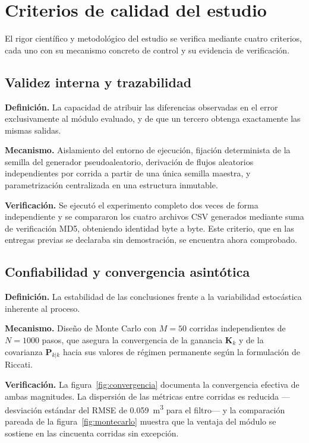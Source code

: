 \section{Criterios de calidad del estudio}
\label{sec:calidad}

El rigor científico y metodológico del estudio se verifica mediante cuatro
criterios, cada uno con su mecanismo concreto de control y su evidencia de
verificación.

\subsection{Validez interna y trazabilidad}

\textbf{Definición.} La capacidad de atribuir las diferencias observadas en el
error exclusivamente al módulo evaluado, y de que un tercero obtenga exactamente
las mismas salidas.

\textbf{Mecanismo.} Aislamiento del entorno de ejecución, fijación determinista
de la semilla del generador pseudoaleatorio, derivación de flujos aleatorios
independientes por corrida a partir de una única semilla maestra, y
parametrización centralizada en una estructura inmutable.

\textbf{Verificación.} Se ejecutó el experimento completo dos veces de forma
independiente y se compararon los cuatro archivos CSV generados mediante suma de
verificación MD5, obteniendo identidad byte a byte. Este criterio, que en las
entregas previas se declaraba sin demostración, se encuentra ahora comprobado.

\subsection{Confiabilidad y convergencia asintótica}

\textbf{Definición.} La estabilidad de las conclusiones frente a la
variabilidad estocástica inherente al proceso.

\textbf{Mecanismo.} Diseño de Monte Carlo con $M = 50$ corridas independientes
de $N = 1000$ pasos, que asegura la convergencia de la ganancia
$\mathbf{K}_{k}$ y de la covarianza $\mathbf{P}_{k|k}$ hacia sus valores de
régimen permanente según la formulación de Riccati.

\textbf{Verificación.} La figura~\ref{fig:convergencia} documenta la
convergencia efectiva de ambas magnitudes. La dispersión de las métricas entre
corridas es reducida —desviación estándar del RMSE de \SI{0,059}{\metre\cubed}
para el filtro— y la comparación pareada de la figura~\ref{fig:montecarlo}
muestra que la ventaja del módulo se sostiene en las cincuenta corridas sin
excepción.

